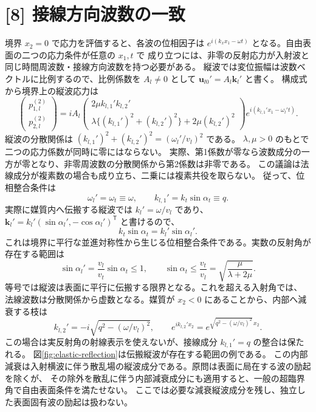 \documentclass[11pt,a4paper]{article}
\begin{document}
\section*{[8] 接線方向波数の一致}
境界 $x_2=0$ で応力を評価すると、各波の位相因子は
$e^{i(k_xx_1-\omega t)}$ となる。自由表面の二つの応力条件が任意の $x_1,t$ で
成り立つには、非零の反射応力が入射波と同じ時間周波数・接線方向波数を持つ必要がある。
縦波では変位振幅は波数ベクトルに比例するので、比例係数を $A_l\ne0$ として
$\boldsymbol u_{l0}'=A_l\boldsymbol k_l'$ と書く。
構成式から境界上の縦波応力は
\[
 \begin{pmatrix}p_{1,l}^{(2)}\\p_{2,l}^{(2)}\end{pmatrix}
 =iA_l
 \begin{pmatrix}
  2\mu k_{l,1}'k_{l,2}'\\
  \lambda\{(k_{l,1}')^2+(k_{l,2}')^2\}+2\mu(k_{l,2}')^2
 \end{pmatrix}
 e^{i(k_{l,1}'x_1-\omega_l't)}.
\]
縦波の分散関係は $(k_{l,1}')^2+(k_{l,2}')^2=(\omega_l'/v_l)^2$ である。
$\lambda,\mu>0$ のもとで二つの応力係数が同時に零にはならない。
実際、第1係数が零なら波数成分の一方が零となり、非零周波数の分散関係から第2係数は非零である。
この議論は法線成分が複素数の場合も成り立ち、二乗には複素共役を取らない。
従って、位相整合条件は
\[
 \omega_l'=\omega_t\equiv\omega,\qquad
 k_{l,1}'=k_t\sin\alpha_t\equiv q.
\]
実際に媒質内へ伝搬する縦波では $k_l'=\omega/v_l$ であり、
$\boldsymbol k_l'=k_l'(\sin\alpha_l',-\cos\alpha_l')^{\mathsf T}$ と書けるので、
\begin{equation}
 \boxed{k_t\sin\alpha_t=k_l'\sin\alpha_l'}.
\end{equation}
これは境界に平行な並進対称性から生じる位相整合条件である。実数の反射角が存在する範囲は
\[
 \sin\alpha_l'=\frac{v_l}{v_t}\sin\alpha_t\le1,
 \qquad
 \boxed{\sin\alpha_t\le\frac{v_t}{v_l}
 =\sqrt{\frac{\mu}{\lambda+2\mu}}}.
\]
等号では縦波は表面に平行に伝搬する限界となる。これを超える入射角では、
法線波数は分散関係から虚数となる。媒質が $x_2<0$ にあることから、内部へ減衰する枝は
\[
 k_{l,2}'=-i\sqrt{q^2-(\omega/v_l)^2},\qquad
 e^{ik_{l,2}'x_2}=e^{\sqrt{q^2-(\omega/v_l)^2}\,x_2}.
\]
この場合は実反射角の射線表示を使えないが、接線成分 $k_{l,1}'=q$ の整合は保たれる。
図\ref{fig:elastic-reflection}は伝搬縦波が存在する範囲の例である。
この内部減衰は入射横波に伴う散乱場の縦波成分である。原問は表面に局在する波の励起を除くが、
その除外を散乱に伴う内部減衰成分にも適用すると、一般の超臨界角で自由表面条件を満たせない。
ここでは必要な減衰縦波成分を残し、独立した表面固有波の励起は扱わない。
\end{document}
